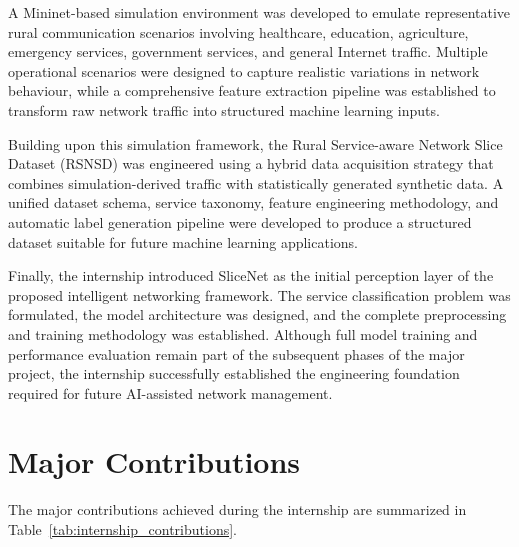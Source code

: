 \documentclass[12pt,a4paper]{report}
\begin{document}
	A Mininet-based simulation environment was developed to emulate representative rural communication scenarios involving healthcare, education, agriculture, emergency services, government services, and general Internet traffic. Multiple operational scenarios were designed to capture realistic variations in network behaviour, while a comprehensive feature extraction pipeline was established to transform raw network traffic into structured machine learning inputs.
	
	Building upon this simulation framework, the Rural Service-aware Network Slice Dataset (RSNSD) was engineered using a hybrid data acquisition strategy that combines simulation-derived traffic with statistically generated synthetic data. A unified dataset schema, service taxonomy, feature engineering methodology, and automatic label generation pipeline were developed to produce a structured dataset suitable for future machine learning applications.
	
	Finally, the internship introduced SliceNet as the initial perception layer of the proposed intelligent networking framework. The service classification problem was formulated, the model architecture was designed, and the complete preprocessing and training methodology was established. Although full model training and performance evaluation remain part of the subsequent phases of the major project, the internship successfully established the engineering foundation required for future AI-assisted network management.
	
	\section{Major Contributions}
	
	The major contributions achieved during the internship are summarized in Table~\ref{tab:internship_contributions}.
	
\end{document}
